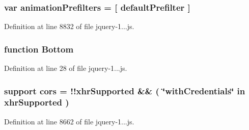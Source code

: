 \hypertarget{_scripts_2jquery-1_810_82_8js_adb3f17c5359fbc12b7043b6969553d78}{}
\subsubsection[{animation\+Prefilters}]{\setlength{\rightskip}{0pt plus 5cm}var animation\+Prefilters = \mbox{[} {\bf default\+Prefilter} \mbox{]}}\label{_scripts_2jquery-1_810_82_8js_adb3f17c5359fbc12b7043b6969553d78}


Definition at line 8832 of file jquery-\/1...\+js.

\hypertarget{_scripts_2jquery-1_810_82_8js_aff76c1cba4a00c678dfce0e0c5a5538a}{}
\subsubsection[{Bottom}]{\setlength{\rightskip}{0pt plus 5cm}function Bottom}\label{_scripts_2jquery-1_810_82_8js_aff76c1cba4a00c678dfce0e0c5a5538a}


Definition at line 28 of file jquery-\/1...\+js.

\hypertarget{_scripts_2jquery-1_810_82_8js_a4b8fe3fdfa8cb03b32c86e4a36575dfc}{}
\subsubsection[{cors}]{ support cors = !!{\bf xhr\+Supported} \&\& ( \char`\"{}with\+Credentials\char`\"{} in {\bf xhr\+Supported} )}\label{_scripts_2jquery-1_810_82_8js_a4b8fe3fdfa8cb03b32c86e4a36575dfc}


Definition at line 8662 of file jquery-\/1...\+js.

\hypertarget{_scripts_2jquery-1_810_82_8js_a2ed3892172b336458b8074254f4471da}{}
